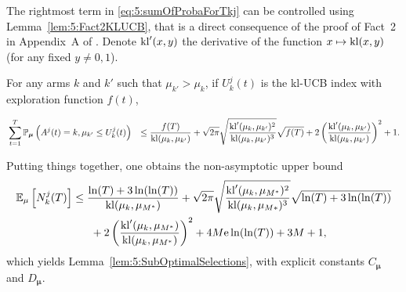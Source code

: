 \begin{smallproof}
  The rightmost term in \eqref{eq:5:sumOfProbaForTkj} can be controlled using Lemma~\ref{lem:5:Fact2KLUCB}, that is a direct consequence of the proof of Fact~2 in Appendix~A of \cite{KLUCBJournal}.
  Denote $\mathrm{kl}'(x,y)$ the derivative of the function $x \mapsto \mathrm{kl}(x,y)$ (for any fixed $y\neq 0, 1$).

  \begin{lemma}\label{lem:5:Fact2KLUCB}
  \begin{leftbar}[lemmabar]  %
    For any arms $k$ and $k'$ such that $\mu_{k'} > \mu_{k}$, if $U_k^{j}(t)$ is the kl-UCB index with exploration function $f(t)$,
    \begin{small} %
      \begin{align*}
        &\sum_{t=1}^T\mathbb{P}_{\bm{\mu}} \left( A^j(t) = k, \mu_{k'} \leq U_k^{j}(t) \right) & \leq  \frac{f(T)}{\mathrm{kl}(\mu_k,\mu_{k'})}
        + \sqrt{2\pi} \sqrt{\frac{\mathrm{kl}'(\mu_k,\mu_{k'})^2}{\mathrm{kl}(\mu_k,\mu_{k'})^3}}\sqrt{f(T)} + 2\left(\frac{\mathrm{kl}'(\mu_k,\mu_{k'})}{\mathrm{kl}(\mu_k,\mu_{k'})}\right)^2 + 1.
      \end{align*}
    \end{small} %
\end{leftbar}  %
\end{lemma}

  Putting things together, one obtains the non-asymptotic upper bound
  \begin{align}\label{eq:5:UBprecise}
    \mathbb{E}_{\mu}\left[N_k^j(T)\right]
    & \leq \frac{\ln(T) + 3 \ln(\ln(T))}{\mathrm{kl}(\mu_k,\mu_{M^*})} + \sqrt{2\pi} \sqrt{\frac{\mathrm{kl}'(\mu_k,\mu_{M^*})^2}{\mathrm{kl}(\mu_k,\mu_{M*})^3}}\sqrt{\ln(T) + 3\ln(\ln(T))}  \nonumber\\
    & \;\;\;\;\;\;+ 2\left(\frac{\mathrm{kl}'(\mu_k,\mu_{M^*})}{\mathrm{kl}(\mu_k,\mu_{M^*})}\right)^2 + 4M \mathrm{e} \ln(\ln(T)) + 3M+1,
  \end{align}
  which yields Lemma~\ref{lem:5:SubOptimalSelections},
  with explicit constants $C_{\boldsymbol{\mu}}$ and $D_{\boldsymbol{\mu}}$.
\end{smallproof}




